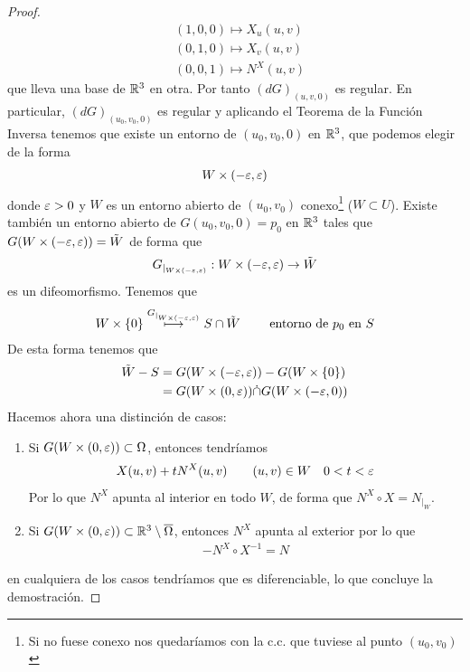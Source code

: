 \begin{teo}
\begin{proof}
\begin{align*}
            &(1,0,0) \mapsto X_u(u,v)\\
            &(0,1,0) \mapsto X_v(u,v)\\
            &(0,0,1) \mapsto N^X(u,v)
        \end{align*}
        que lleva una base de $\mathbb{R}^3$ en otra. Por tanto $(dG)_{(u,v,0)}$ es regular. En particular, $(dG)_{(u_0,v_0,0)}$ es regular y aplicando el Teorema de la Función Inversa tenemos que existe un entorno de $(u_0, v_0, 0)$ en $\mathbb{R}^3$, que podemos elegir de la forma
        \begin{gather*}
            W \times (-\varepsilon, \varepsilon)
        \end{gather*}
        donde $\varepsilon>0$ y $W$ es un entorno abierto de $(u_0, v_0)$ conexo\footnote{Si no fuese conexo nos quedaríamos con la c.c. que tuviese al punto $(u_0, v_0)$} ($W\subset U$). Existe también un entorno abierto de $G(u_0, v_0, 0)=p_0$ en $\mathbb{R}^3$ tales que $G(W\times(-\varepsilon, \varepsilon))=\tilde{W}$ de forma que 
        \begin{gather*}
            G_{|_{W\times(-\varepsilon, \varepsilon)}} : W\times (-\varepsilon, \varepsilon) \to \tilde{W}
        \end{gather*}
        es un difeomorfismo. Tenemos que 
        \begin{gather*}
            W\times\{0\} \overset{G_{|_{W\times(-\varepsilon, \varepsilon)}}}{\longmapsto} S\cap \tilde{W} \qquad \text{ entorno de $p_0$ en $S$}
        \end{gather*}
        De esta forma tenemos que 
        \begin{align*}
            \tilde{W}-S &= G(W\times(-\varepsilon, \varepsilon)) - G(W\times\{0\})\\
            &=
            G(W\times(0,\varepsilon)) \dot{\cap} G(W\times(-\varepsilon,0))
        \end{align*}
        Hacemos ahora una distinción de casos:
        \begin{enumerate}
            \item[i)] Si $G(W\times (0,\varepsilon))\subset \Omega$, entonces tendríamos
            \begin{gather*}
                X(u,v) + tN^X(u,v) \qquad (u,v)\in W \quad 0<t<\varepsilon
            \end{gather*}
            Por lo que $N^X$ apunta al interior en todo $W$, de forma que $N^X\circ X = N_{|_W}$.
            
            \item[ii)] Si $G(W\times (0,\varepsilon))\subset \mathbb{R}^3 \setminus \overline{\Omega}$, entonces $N^X$ apunta al exterior por lo que 
            \begin{gather*}
                -N^X \circ X^{-1} = N
            \end{gather*}
        \end{enumerate}
        en cualquiera de los casos tendríamos que es diferenciable, lo que concluye la demostración.
    \end{proof}
\end{teo}

